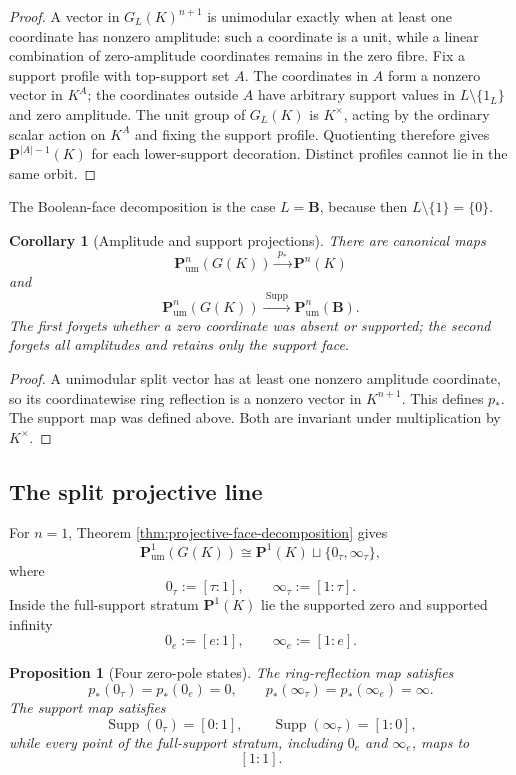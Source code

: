 \documentclass[11pt]{amsart}
\numberwithin{equation}{section}
\newtheorem{proposition}[theorem]{Proposition}
\newtheorem{corollary}[theorem]{Corollary}
\theoremstyle{definition}
\newcommand{\B}{\mathbf B}
\newcommand{\Supp}{\operatorname{Supp}}
\newcommand{\Pum}{\mathbf P_{\mathrm{um}}}
\begin{document}
\begin{proof}
A vector in $G_L(K)^{n+1}$ is unimodular exactly when at least one
coordinate has nonzero amplitude: such a coordinate is a unit, while a
linear combination of zero-amplitude coordinates remains in the zero
fibre.  Fix a support profile with top-support set $A$.  The coordinates in
$A$ form a nonzero vector in $K^A$; the coordinates outside $A$ have
arbitrary support values in $L\setminus\{1_L\}$ and zero amplitude.  The
unit group of $G_L(K)$ is $K^\times$, acting by the ordinary scalar action
on $K^A$ and fixing the support profile.  Quotienting therefore gives
$\mathbf P^{|A|-1}(K)$ for each lower-support decoration.  Distinct profiles
cannot lie in the same orbit.
\end{proof}

The Boolean-face decomposition is the case $L=\B$, because then
$L\setminus\{1\}=\{0\}$.

\begin{corollary}[Amplitude and support projections]\label{cor:projective-projections}
There are canonical maps
\[
\Pum^n(G(K))\xrightarrow{\;p_*\;}\mathbf P^n(K)
\]
and
\[
\Pum^n(G(K))\xrightarrow{\;\Supp\;}\Pum^n(\B).
\]
The first forgets whether a zero coordinate was absent or supported; the second forgets all amplitudes and retains only the support face.
\end{corollary}

\begin{proof}
A unimodular split vector has at least one nonzero amplitude coordinate, so its coordinatewise ring reflection is a nonzero vector in $K^{n+1}$.  This defines $p_*$.  The support map was defined above.  Both are invariant under multiplication by $K^\times$.
\end{proof}

\subsection{The split projective line}

For $n=1$, Theorem \ref{thm:projective-face-decomposition} gives
\[
\Pum^1(G(K))
\cong
\mathbf P^1(K)\sqcup\{0_\tau,\infty_\tau\},
\]
where
\[
0_\tau:=[\tau:1],
\qquad
\infty_\tau:=[1:\tau].
\]
Inside the full-support stratum $\mathbf P^1(K)$ lie the supported zero and supported infinity
\[
0_e:=[e:1],
\qquad
\infty_e:=[1:e].
\]

\begin{proposition}[Four zero-pole states]\label{prop:four-zero-pole-states}
The ring-reflection map satisfies
\[
p_*(0_\tau)=p_*(0_e)=0,
\qquad
p_*(\infty_\tau)=p_*(\infty_e)=\infty.
\]
The support map satisfies
\[
\Supp(0_\tau)=[0:1],
\qquad
\Supp(\infty_\tau)=[1:0],
\]
while every point of the full-support stratum, including $0_e$ and $\infty_e$, maps to
\[
[1:1].
\]
\end{proposition}
\end{document}
